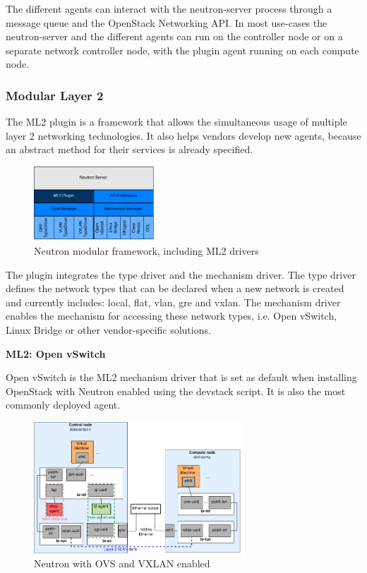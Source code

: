 The different agents can interact with the neutron-server process through a message queue and the OpenStack Networking API. In most use-cases the neutron-server and the different agents can run on the controller node or on a separate network controller node, with the plugin agent running on each compute node.


\subsubsection{Modular Layer 2}

The ML2 plugin is a framework that allows the simultaneous usage of multiple layer 2 networking technologies. It also helps vendors develop new agents, because an abstract method for their services is already specified.

\begin{figure}[H]
\centering
\includegraphics[width=0.4\textwidth]{images/fundamentals/neutron_ml2.png}
\caption{Neutron modular framework, including ML2 drivers}
\end{figure}

The plugin integrates the type driver and the mechanism driver. The type driver defines the network types that can be declared when a new network is created and currently includes: local, flat, vlan, gre and vxlan. The mechanism driver enables the mechanism for accessing these network types, i.e. Open vSwitch, Linux Bridge or other vendor-specific solutions. 


\newpage
\textbf{ML2: Open vSwitch}

Open vSwitch is the ML2 mechanism driver that is set as default when installing OpenStack with Neutron enabled using the devstack script. It is also the most commonly deployed agent.

\begin{figure}[H]
\centering
\includegraphics[width=0.7\textwidth]{images/fundamentals/neutron_ovs_bridges.png}
\caption{Neutron with OVS and VXLAN enabled}\label{fig:neutron-ovs}
\end{figure}

